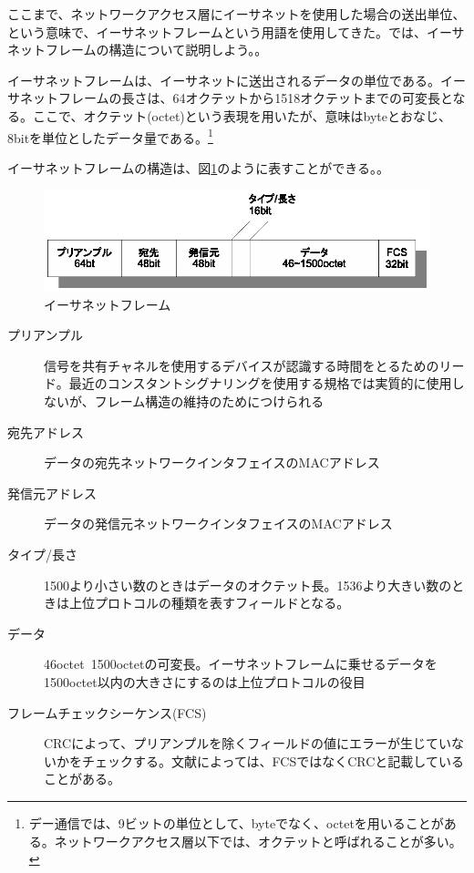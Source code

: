 ここまで、ネットワークアクセス層にイーサネットを使用した場合の送出単位、という意味で、イーサネットフレームという用語を使用してきた。では、イーサネットフレームの構造について説明しよう。。

イーサネットフレームは、イーサネットに送出されるデータの単位である。イーサネットフレームの長さは、64オクテットから1518オクテットまでの可変長となる。ここで、オクテット(octet)という表現を用いたが、意味はbyteとおなじ、8bitを単位としたデータ量である。\footnote{デー通信では、9ビットの単位として、byteでなく、octetを用いることがある。ネットワークアクセス層以下では、オクテットと呼ばれることが多い。}

イーサネットフレームの構造は、図\ref{fig:etherframe}のように表すことができる。。

\begin{figure}[htbp]
	\includegraphics[width=14cm,clip]{draw/ethernetframe.eps}
	\caption{イーサネットフレーム}
	\label{fig:etherframe}
\end{figure}


\begin{description}
\item[プリアンプル]信号を共有チャネルを使用するデバイスが認識する時間をとるためのリード。最近のコンスタントシグナリングを使用する規格では実質的に使用しないが、フレーム構造の維持のためにつけられる
\item[宛先アドレス]データの宛先ネットワークインタフェイスのMACアドレス
\item[発信元アドレス]データの発信元ネットワークインタフェイスのMACアドレス
\item[タイプ/長さ]1500より小さい数のときはデータのオクテット長。1536より大きい数のときは上位プロトコルの種類を表すフィールドとなる。
\item[データ]46octet~1500octetの可変長。イーサネットフレームに乗せるデータを1500octet以内の大きさにするのは上位プロトコルの役目
\item[フレームチェックシーケンス(FCS)]CRCによって、プリアンプルを除くフィールドの値にエラーが生じていないかをチェックする。文献によっては、FCSではなくCRCと記載していることがある。
\end{description}

